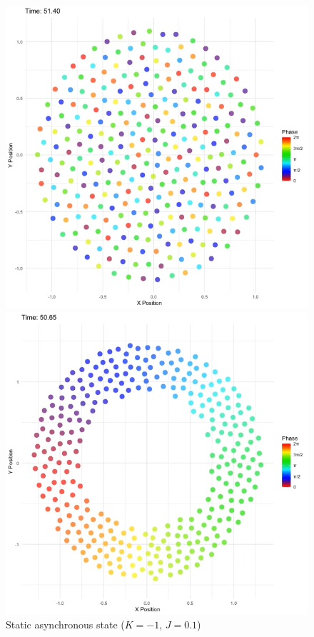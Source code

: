 \begin{figure}[p] %

    \begin{minipage}{\imagewidth}
        \centering
        \includegraphics[width=\textwidth]{images/task20/static_async.png}
        \caption{Static asynchronous state \newline ($K=-1$, $J=0.1$)}
        \label{fig:static_async}
    \end{minipage}
    \hfill
    \begin{minipage}{\imagewidth}
        \centering
  \includegraphics[width=\textwidth]{images/task20/static_phase_wave.png}

\end{minipage}
\end{figure}

